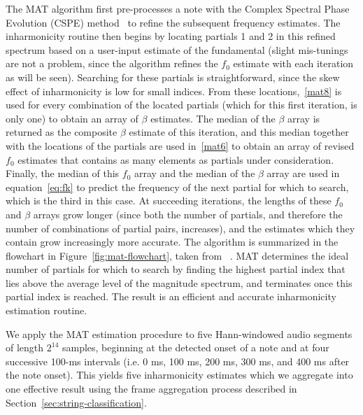 \documentclass[12pt]{cmuthesis}
\begin{document}
The MAT algorithm first pre-processes a note with the Complex Spectral Phase Evolution (CSPE) method~\cite{short2006} to refine the subsequent frequency estimates. The inharmonicity routine then begins by locating partials 1 and 2 in this refined spectrum based on a user-input estimate of the fundamental (slight mis-tunings are not a problem, since the algorithm refines the $f_0$ estimate with each iteration as will be seen). Searching for these partials is straightforward, since the skew effect of inharmonicity is low for small indices. From these locations,~\eqref{mat8} is used for every combination of the located partials (which for this first iteration, is only one) to obtain an array of $\beta$ estimates. The median of the $\beta$ array is returned as the composite $\beta$ estimate of this iteration, and this median together with the locations of the partials are used in~\eqref{mat6} to obtain an array of revised $f_0$ estimates that contains as many elements as partials under consideration. Finally, the median of this $f_0$ array and the median of the $\beta$ array are used in equation~\eqref{eq:fk} to predict the frequency of the next partial for which to search, which is the third in this case. At succeeding iterations, the lengths of these $f_0$ and $\beta$ arrays grow longer (since both the number of partials, and therefore the number of combinations of partial pairs, increases), and the estimates which they contain grow increasingly more accurate. The algorithm is summarized in the flowchart in Figure~\ref{fig:mat-flowchart}, taken from ~\cite{hodgkinson2009}. MAT determines the ideal number of partials for which to search by finding the highest partial index that lies above the average level of the magnitude spectrum, and terminates once this partial index is reached. The result is an efficient and accurate inharmonicity estimation routine. 

We apply the MAT estimation procedure to five Hann-windowed audio segments of length $2^{14}$ samples, beginning at the detected onset of a note and at four successive 100-ms intervals (i.e. 0 ms, 100 ms, 200 ms, 300 ms, and 400 ms after the note onset). This yields five inharmonicity estimates which we aggregate into one effective result using the frame aggregation process described in Section~\ref{sec:string-classification}.
\end{document}
